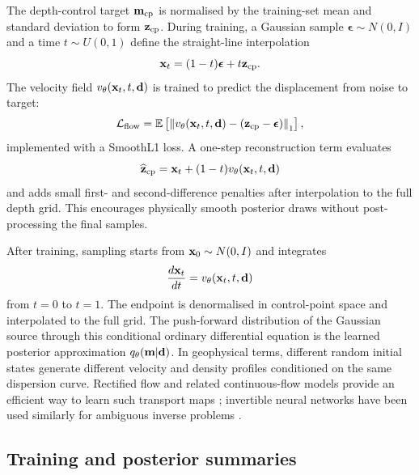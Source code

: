 \documentclass[referee]{gji}
\begin{document}
The depth-control target ${\bf m}_{\rm cp}$ is normalised by the training-set mean and standard deviation to form ${\bf z}_{\rm cp}$. During training, a Gaussian sample $\boldsymbol{\epsilon}\sim N(0,I)$ and a time $t\sim U(0,1)$ define the straight-line interpolation
\begin{equation}
{\bf x}_t=(1-t)\boldsymbol{\epsilon}+t{\bf z}_{\rm cp}.
\end{equation}
The velocity field $v_\theta({\bf x}_t,t,{\bf d})$ is trained to predict the displacement from noise to target:
\begin{equation}
\mathcal{L}_{\rm flow}=
\mathbb{E}\left[
\left\|v_\theta({\bf x}_t,t,{\bf d})-({\bf z}_{\rm cp}-\boldsymbol{\epsilon})\right\|_1
\right],
\label{eq:flowloss}
\end{equation}
implemented with a SmoothL1 loss. A one-step reconstruction term evaluates
\begin{equation}
\widehat{\bf z}_{\rm cp}={\bf x}_t+(1-t)v_\theta({\bf x}_t,t,{\bf d})
\end{equation}
and adds small first- and second-difference penalties after interpolation to the full depth grid. This encourages physically smooth posterior draws without post-processing the final samples.

After training, sampling starts from ${\bf x}_0\sim N(0,I)$ and integrates
\begin{equation}
\frac{d{\bf x}_t}{dt}=v_\theta({\bf x}_t,t,{\bf d})
\label{eq:ode}
\end{equation}
from $t=0$ to $t=1$. The endpoint is denormalised in control-point space and interpolated to the full grid. The push-forward distribution of the Gaussian source through this conditional ordinary differential equation is the learned posterior approximation $q_\theta({\bf m}|{\bf d})$. In geophysical terms, different random initial states generate different velocity and density profiles conditioned on the same dispersion curve. Rectified flow and related continuous-flow models provide an efficient way to learn such transport maps \citep{LiuGongLiu2022,LipmanEtAl2023}; invertible neural networks have been used similarly for ambiguous inverse problems \citep{ArdizzoneEtAl2019}.

\subsection{Training and posterior summaries}
\end{document}
